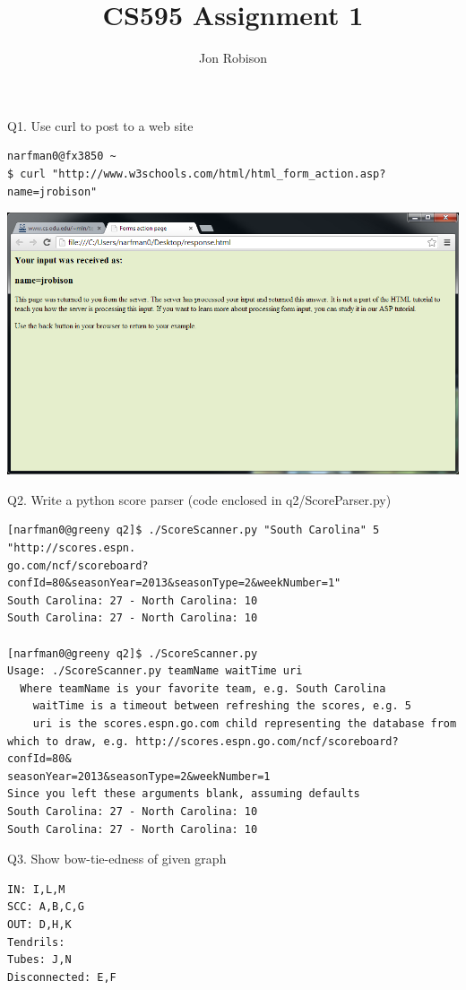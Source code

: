 \documentclass{article}
\begin{document}
\author{Jon Robison}
\title{CS595 Assignment 1}
\maketitle

Q1. Use curl to post to a web site
\begin{verbatim}
narfman0@fx3850 ~
$ curl "http://www.w3schools.com/html/html_form_action.asp?name=jrobison"
\end{verbatim}
\graphicspath{{q1/}}
\includegraphics[scale=.4]{response.png}

Q2. Write a python score parser (code enclosed in q2/ScoreParser.py)
\begin{verbatim}
[narfman0@greeny q2]$ ./ScoreScanner.py "South Carolina" 5 "http://scores.espn.
go.com/ncf/scoreboard?confId=80&seasonYear=2013&seasonType=2&weekNumber=1"
South Carolina: 27 - North Carolina: 10
South Carolina: 27 - North Carolina: 10

[narfman0@greeny q2]$ ./ScoreScanner.py
Usage: ./ScoreScanner.py teamName waitTime uri
  Where teamName is your favorite team, e.g. South Carolina
    waitTime is a timeout between refreshing the scores, e.g. 5
    uri is the scores.espn.go.com child representing the database from 
which to draw, e.g. http://scores.espn.go.com/ncf/scoreboard?confId=80&
seasonYear=2013&seasonType=2&weekNumber=1
Since you left these arguments blank, assuming defaults
South Carolina: 27 - North Carolina: 10
South Carolina: 27 - North Carolina: 10
\end{verbatim}

Q3. Show bow-tie-edness of given graph
\begin{verbatim}
IN: I,L,M
SCC: A,B,C,G
OUT: D,H,K
Tendrils:
Tubes: J,N
Disconnected: E,F
\end{verbatim}
\end{document}
